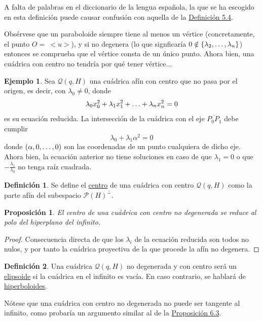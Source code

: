 \documentclass[12pt]{report}
\newtheorem{proposition}{Proposición}[chapter]
\theoremstyle{definition}
\newtheorem{definition}{Definición}[chapter]
\theoremstyle{definition}
\newtheorem{example}{Ejemplo}[chapter]
\theoremstyle{remark}
\begin{document}
A falta de palabras en el diccionario de la lengua española, la que se ha escogido en esta definición puede causar confusión con aquella de la \hyperref[def5.4.]{\color{blue}Definición 5.4}. 

\vspace{2mm}
Obsérvese que un paraboloide siempre tiene al menos un vértice (concretamente, el punto $O = \ <u>$), y si no degenera (lo que signficaría $0 \notin \{\lambda_2,\mathellipsis,\lambda_n\}$) entonces se comprueba que el vértice consta de un único punto. Ahora bien, una cuádrica con centro no tendría por qué tener vértice...

\begin{example}
Sea $\mathcal{Q}(q,H)$ una cuádrica afín con centro que no pasa por el origen, es decir, con $\lambda_0 \neq 0$, donde
\[\lambda_0 x_0^2 + \lambda_1 x_1^2 + \mathellipsis + \lambda_nx_n^2 = 0\]
es su ecuación reducida. La intersección de la cuádrica con el eje $\overline{P_0P_1}$ debe cumplir
\[\lambda_0+\lambda_1\alpha^2 = 0\]
donde $(\alpha,0,\mathellipsis,0)$ son las coordenadas de un punto cualquiera de dicho eje. Ahora bien, la ecuación anterior no tiene soluciones en caso de que $\lambda_1 = 0$ o que $-\frac{\lambda_1}{\lambda_0}$ no tenga raíz cuadrada.
\end{example}

\begin{definition}
Se define el \ul{centro} de una cuádrica con centro $\mathcal{Q}(q,H)$ como la parte afín del subespacio $\mathcal{P}(H)^\perp$.
\end{definition}

\begin{proposition}
El centro de una cuádrica con centro no degenerada se reduce al polo del hiperplano del infinito.
\end{proposition}

\begin{proof}
Consecuencia directa de que los $\lambda_i$ de la ecuación reducida son todos no nulos, y por tanto la cuádrica proyectiva de la que procede la afín no degenera.
\end{proof}

\begin{definition}
Una cuádrica $\mathcal{Q}(q,H)$ no degenerada y con centro será un \ul{elipsoide} si la cuádrica en el infinito es vacía. En caso contrario, se hablará de \ul{hiperboloides}.
\end{definition}

Nótese que una cuádrica con centro no degenerada no puede ser tangente al infinito, como probaría un argumento similar al de la \hyperref[prop6.3.]{\color{blue}Proposición 6.3}.
\end{document}
